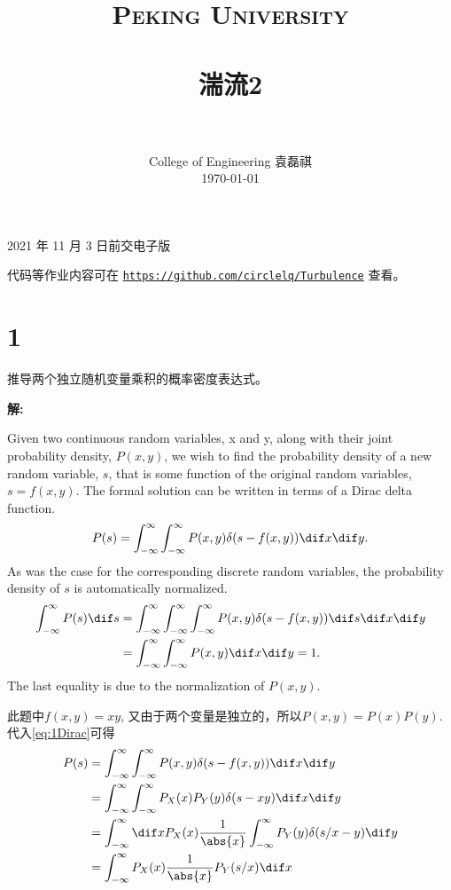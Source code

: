 \documentclass[12pt,a4]{ctexart}
\title{
	\vspace{-1in} 	
	\usefont{OT1}{bch}{b}{n}
	\normalfont \normalsize \textsc{\LARGE Peking University}\\[1cm] %
	\horrule{0.5pt} \\[0.5cm]
	\huge \bfseries{湍流2} \\
	\horrule{2pt} \\[0.5cm]
}
\author{
	\normalfont 								\normalsize
	College of Engineering \quad 2001111690  \quad 袁磊祺\\	\normalsize
	\today
}
\date{}
\begin{document}


\maketitle

2021 年 11 月 3 日前交电子版

代码等作业内容可在 \texttt{\href{https://github.com/circlelq/Turbulence}{https://github.com/circlelq/Turbulence}} 查看。

\section{1}

推导两个独立随机变量乘积的概率密度表达式。

\textsf{\hspace{-2em}\sf  \textbf{解:}}

Given two continuous random variables, x and y, along with their joint probability density, $P(x,y)$, we wish to find the probability density of a new random variable, $s$, that is some function of the original random variables, $s = f (x, y)$. The formal solution can be written in terms of a Dirac delta function.\cite{Swendsen}
\begin{equation}
	P(s)=\int_{-\infty}^{\infty} \int_{-\infty}^{\infty} P(x, y) \delta(s-f(x, y)) \dif x \dif y.
	\label{eq:1Dirac}
\end{equation}
As was the case for the corresponding discrete random variables, the probability density of $s$ is automatically normalized.
\begin{equation}
	\begin{aligned}
		\int_{-\infty}^{\infty} P(s) \dif s & =\int_{-\infty}^{\infty} \int_{-\infty}^{\infty} \int_{-\infty}^{\infty} P(x, y) \delta(s-f(x, y)) \dif s \dif x \dif y \\
		                                    & =\int_{-\infty}^{\infty} \int_{-\infty}^{\infty} P(x, y) \dif x \dif y=1.
	\end{aligned}
\end{equation}
The last equality is due to the normalization of $P(x, y)$.

此题中$f (x, y) = x y $, 又由于两个变量是独立的，所以$P(x,y) = P(x) P(y)$.代入\cref{eq:1Dirac}可得
\begin{equation}
	\begin{aligned}
		P(s) & =\int_{-\infty}^{\infty} \int_{-\infty}^{\infty} P(x, y) \delta(s-f(x, y)) \dif x \dif y                        \\
		     & =\int_{-\infty}^{\infty} \int_{-\infty}^{\infty} P_X(x) P_Y(y) \delta(s-xy) \dif x \dif y                       \\
		     & =\int_{-\infty}^{\infty} \dif x P_X(x) \frac{1}{\abs{x}} \int_{-\infty}^{\infty}   P_Y(y) \delta(s/x-y)  \dif y \\
		     & =\int_{-\infty}^{\infty}  P_X(x) \frac{1}{\abs{x}} P_Y(s/x) \dif x                                              \\
	\end{aligned}
\end{equation}
\end{document}
